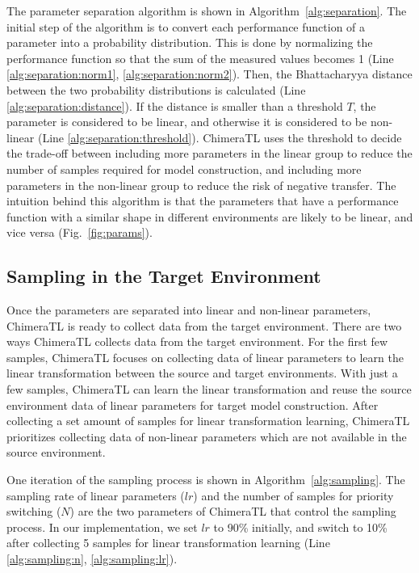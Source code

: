 The parameter separation algorithm is shown in Algorithm~\ref{alg:separation}.
The initial step of the algorithm is to convert each performance function of a parameter into a probability distribution.
This is done by normalizing the performance function so that the sum of the measured values becomes 1 (Line \ref{alg:separation:norm1}, \ref{alg:separation:norm2}).
Then, the Bhattacharyya distance between the two probability distributions is calculated (Line \ref{alg:separation:distance}).
If the distance is smaller than a threshold $T$, the parameter is considered to be linear, and otherwise it is considered to be non-linear (Line \ref{alg:separation:threshold}).
ChimeraTL uses the threshold to decide the trade-off between including more parameters in the linear group to reduce the number of samples required for model construction, and including more parameters in the non-linear group to reduce the risk of negative transfer.
The intuition behind this algorithm is that the parameters that have a performance function with a similar shape in different environments are likely to be linear, and vice versa (Fig.~\ref{fig:params}).


\subsection{Sampling in the Target Environment}
Once the parameters are separated into linear and non-linear parameters, ChimeraTL is ready to collect data from the target environment. 
There are two ways ChimeraTL collects data from the target environment.
For the first few samples, ChimeraTL focuses on collecting data of linear parameters to learn the linear transformation between the source and target environments.
With just a few samples, ChimeraTL can learn the linear transformation and reuse the source environment data of linear parameters for target model construction.
After collecting a set amount of samples for linear transformation learning, ChimeraTL prioritizes collecting data of non-linear parameters which are not available in the source environment.

One iteration of the sampling process is shown in Algorithm~\ref{alg:sampling}.
The sampling rate of linear parameters ($lr$) and the number of samples for priority switching ($N$) are the two parameters of ChimeraTL that control the sampling process.
In our implementation, we set $lr$ to 90\% initially, and switch to 10\% after collecting 5 samples for linear transformation learning (Line \ref{alg:sampling:n}, \ref{alg:sampling:lr}).

